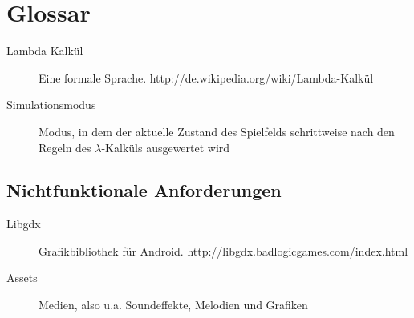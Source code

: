\section{Glossar}
\begin{description}
	\item[Lambda Kalkül] Eine formale Sprache. http://de.wikipedia.org/wiki/Lambda-Kalkül
	\item[Simulationsmodus] Modus, in dem der aktuelle Zustand des Spielfelds schrittweise nach den Regeln des $\lambda$-Kalküls ausgewertet wird
\end{description}

\subsection{Nichtfunktionale Anforderungen}
\begin{description}
	\item[Libgdx] Grafikbibliothek für Android. http://libgdx.badlogicgames.com/index.html
	\item[Assets] Medien, also u.a. Soundeffekte, Melodien und Grafiken
\end{description}
